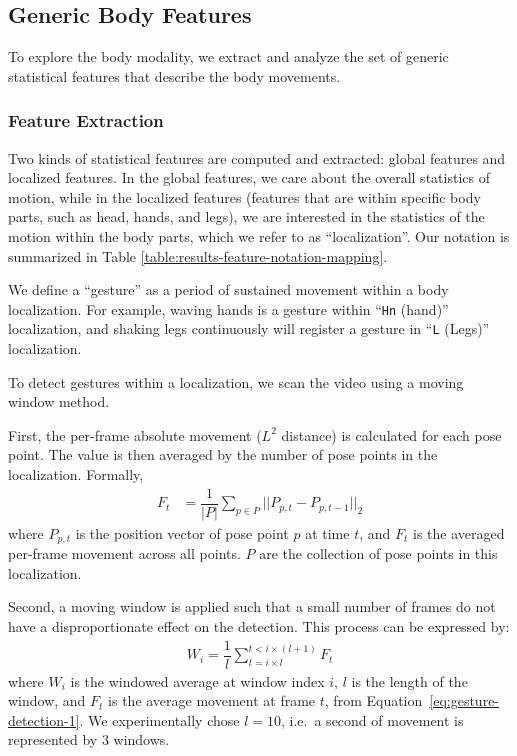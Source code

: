 \subsection{Generic Body Features} \label{sec:meta_gesture_feature_extraction}


To explore the body modality, we extract and analyze the set of generic statistical features that describe the body movements.
\subsubsection{Feature Extraction}
Two kinds of statistical features are computed and extracted: global features and localized features.
In the global features, we care about the overall statistics of motion, while in the localized features (features that are within specific body parts, such as head, hands, and legs), we are interested in the statistics of the motion within the body parts, which we refer to as ``localization''. Our notation is summarized in Table \ref{table:results-feature-notation-mapping}.

We define a ``gesture'' as a period of sustained movement within a body localization. For example, waving hands is a gesture within ``\texttt{Hn} (hand)'' localization, and shaking legs continuously will register a gesture in ``\texttt{L} (Legs)'' localization.

To detect gestures within a localization, we scan the video using a moving window method.


First, the per-frame absolute movement ($L^2$ distance) is calculated for each pose point.
The value is then averaged by the number of pose points in the localization.
Formally,
\begin{equation}
  \begin{split}
F_{t} & = \dfrac{1}{|P|}\sum_{p \in P} ||P_{p,t} - P_{p,t-1}||_{2}
  \end{split}
  \label{eq:gesture-detection-1}
\end{equation}
where $P_{p, t}$ is the position
vector of pose point $p$ at time $t$, and $F_{t}$ is the averaged per-frame movement across all points. $P$ are the collection of pose points in this localization.

Second, a moving window is applied such that a small number of frames do not have a
disproportionate effect on the detection. This process can be expressed by:
\begin{equation}
  \begin{split}
    W_{i} = \dfrac{1}{l}\sum_{t = i \times l}^{t < i \times (l + 1)}F_{t}
  \end{split}
\end{equation}
where $W_{i}$ is the windowed average at window index $i$, $l$ is the length of the window, and
$F_{t}$ is the average movement at frame $t$, from Equation~\ref{eq:gesture-detection-1}.
We experimentally chose $l = 10$, i.e.\ a second of movement is represented by $3$ windows.

